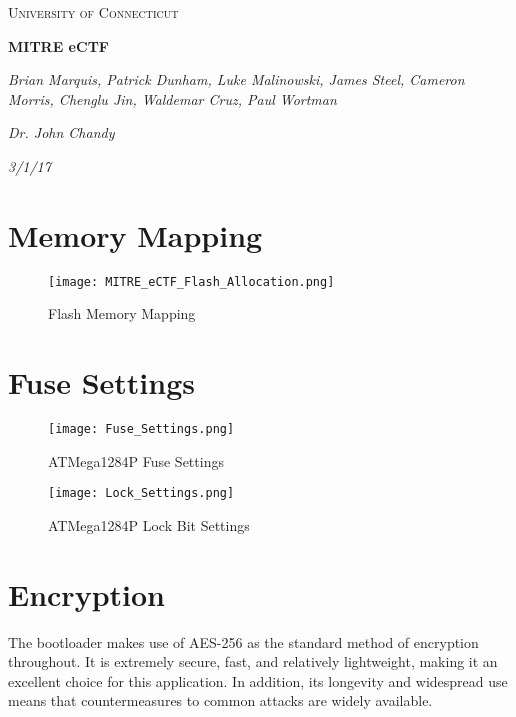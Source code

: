 \documentclass[11pt]{article}
\begin{document}
\begin{titlepage}
	\centering
	\vspace{1cm}
	{\scshape\Large University of Connecticut\par}
	\vspace{1.5cm}
	{\huge\bfseries MITRE eCTF\par}
	\vspace{2cm}
	{\Large\itshape Brian Marquis, Patrick Dunham, Luke Malinowski, James Steel, Cameron Morris, Chenglu Jin, Waldemar Cruz, Paul Wortman\par}
	{\Large\itshape Dr. John Chandy\par}
    {\Large\itshape 3/1/17\par}
\tableofcontents
\vfill
\end{titlepage}
\section{Memory Mapping}
\begin{figure}[!h]
\begin{center}
\texttt{[image: MITRE\_eCTF\_Flash\_Allocation.png]}
\caption{Flash Memory Mapping}
\end{center}
\end{figure}
\section{Fuse Settings}
\begin{figure}[!h]
\begin{center}
\texttt{[image: Fuse\_Settings.png]}
\caption{ATMega1284P Fuse Settings}
\end{center}
\end{figure}
\begin{figure}[!h]
\begin{center}
\texttt{[image: Lock\_Settings.png]}
\caption{ATMega1284P Lock Bit Settings}
\end{center}
\end{figure}
\section{Encryption}
The bootloader makes use of AES-256 as the standard method of encryption throughout. It is extremely secure, fast, and relatively lightweight, making it an excellent choice for this application. In addition, its longevity and widespread use means that countermeasures to common attacks are widely available. 
\end{document}
